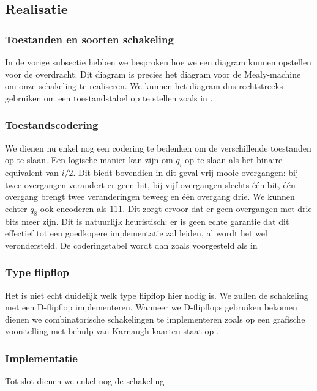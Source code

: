 \subsection{Realisatie}
\subsubsection{Toestanden en soorten schakeling}
In de vorige subsectie hebben we besproken hoe we een diagram kunnen opstellen voor de overdracht. Dit diagram is precies het diagram voor de Mealy-machine om onze schakeling te realiseren. We kunnen het diagram dus rechtstreeks gebruiken om een toestandstabel op te stellen zoals in .
\subsubsection{Toestandscodering}
We dienen nu enkel nog een codering te bedenken om de verschillende toestanden op te slaan. Een logische manier kan zijn om $q_i$ op te slaan als het binaire equivalent van $i/2$. Dit biedt bovendien in dit geval vrij mooie overgangen: bij twee overgangen verandert er geen bit, bij vijf overgangen slechts \'e\'en bit, \'e\'en overgang brengt twee veranderingen teweeg en \'e\'en overgang drie. We kunnen echter $q_8$ ook encoderen als $111$. Dit zorgt ervoor dat er geen overgangen met drie bits meer zijn. Dit is natuurlijk heuristisch: er is geen echte garantie dat dit effectief tot een goedkopere implementatie zal leiden, al wordt het wel verondersteld. De coderingstabel wordt dan zoals voorgesteld als in 
\subsubsection{Type flipflop}
Het is niet echt duidelijk welk type flipflop hier nodig is. We zullen de schakeling met een D-flipflop implementeren.
Wanneer we D-flipflops gebruiken bekomen dienen we combinatorische schakelingen te implementeren zoals op  een grafische voorstelling met behulp van Karnaugh-kaarten staat op .
\subsubsection{Implementatie}
Tot slot dienen we enkel nog de schakeling 
